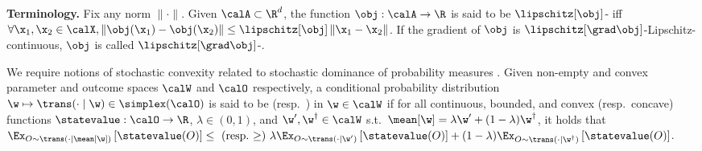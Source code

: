 \textbf{Terminology.}
Fix any norm $\| \cdot \|$. Given $\calA \subset \R^d$, the function $\obj: \calA \to \R$ is said to be $\lipschitz[\obj]$- iff $\forall \x_1, \x_2 \in \calX, \left\| \obj(\x_1) - \obj(\x_2) \right\| \leq \lipschitz[\obj] \left\| \x_1 - \x_2 \right\|$.
If the gradient of $\obj$ is $\lipschitz[\grad \obj]$-Lipschitz-continuous, $\obj$ is called $\lipschitz[\grad \obj]$-. 

We require notions of stochastic convexity related to stochastic dominance of probability measures \cite{atakan2003valfunc}.
Given non-empty and convex parameter and outcome spaces $\calW$ and $\calO$ respectively, a conditional probability distribution $\w \mapsto \trans(\cdot \mid \w) \in \simplex (\calO)$ is said to be  (resp.\ ) in $\w \in \calW$ if for all continuous, bounded, and convex (resp.\ concave) functions $\statevalue: \calO \to \R$,  $\lambda \in (0,1)$, and $\w^\prime, \w^\dagger \in \calW$ s.t.\ $\mean[\w] = \lambda \w^\prime + (1-\lambda)  \w^\dagger$, it holds that $\Ex_{O \sim \trans(\cdot \mid \mean[\w])} \left[\statevalue(O)\right] \leq \text{ (resp.\@ $\geq$) } \lambda \Ex_{O \sim  \trans(\cdot \mid \w^\prime)} \left[\statevalue(O)\right] + (1-\lambda)\Ex_{O \sim \trans(\cdot \mid \w^\dagger)} \left[\statevalue(O)\right]$.
